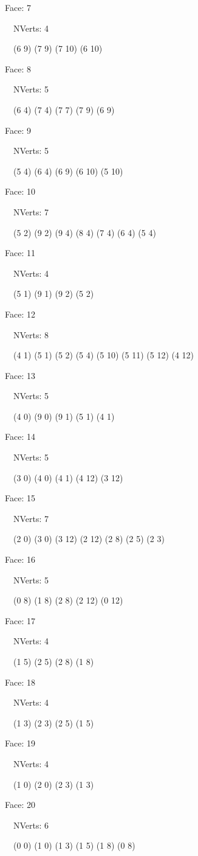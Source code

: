 \documentclass{article}
\begin{document}
{\footnotesize 

Face: 7

\   \    NVerts: 4

 \   \   (6 9) (7 9) (7 10) (6 10)}

{\footnotesize 

Face: 8

\   \    NVerts: 5

 \   \   (6 4) (7 4) (7 7) (7 9) (6 9)}

{\footnotesize 

Face: 9

\   \    NVerts: 5

 \   \   (5 4) (6 4) (6 9) (6 10) (5 10)}

{\footnotesize 

Face: 10

\   \    NVerts: 7

 \   \   (5 2) (9 2) (9 4) (8 4) (7 4) (6 4) (5 4)}

{\footnotesize 

Face: 11

\   \    NVerts: 4

 \   \   (5 1) (9 1) (9 2) (5 2)}

{\footnotesize 

Face: 12

\   \    NVerts: 8

 \   \   (4 1) (5 1) (5 2) (5 4) (5 10) (5 11) (5 12) (4 12)}

{\footnotesize 

Face: 13

\   \    NVerts: 5

 \   \   (4 0) (9 0) (9 1) (5 1) (4 1)}

{\footnotesize 

Face: 14

\   \    NVerts: 5

 \   \   (3 0) (4 0) (4 1) (4 12) (3 12)}

{\footnotesize 

Face: 15

\   \    NVerts: 7

 \   \   (2 0) (3 0) (3 12) (2 12) (2 8) (2 5) (2 3)}

{\footnotesize 

Face: 16

\   \    NVerts: 5

 \   \   (0 8) (1 8) (2 8) (2 12) (0 12)}

{\footnotesize 

Face: 17

\   \    NVerts: 4

 \   \   (1 5) (2 5) (2 8) (1 8)}

{\footnotesize 

Face: 18

\   \    NVerts: 4

 \   \   (1 3) (2 3) (2 5) (1 5)}

{\footnotesize 

Face: 19

\   \    NVerts: 4

 \   \   (1 0) (2 0) (2 3) (1 3)}

{\footnotesize 

Face: 20

\   \    NVerts: 6

 \   \   (0 0) (1 0) (1 3) (1 5) (1 8) (0 8)}


 \newpage
\end{document}
